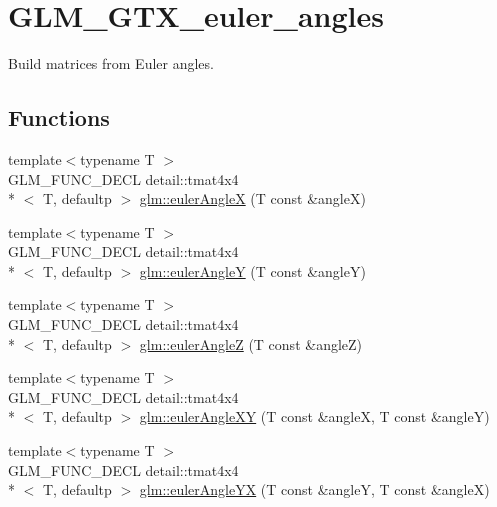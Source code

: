 \hypertarget{group__gtx__euler__angles}{\section{G\-L\-M\-\_\-\-G\-T\-X\-\_\-euler\-\_\-angles}
\label{group__gtx__euler__angles}
}


Build matrices from Euler angles.  


\subsection*{Functions}
\begin{DoxyCompactItemize}
\item 
{\footnotesize template$<$typename T $>$ }\\G\-L\-M\-\_\-\-F\-U\-N\-C\-\_\-\-D\-E\-C\-L detail\-::tmat4x4\\*
$<$ T, defaultp $>$ \hyperlink{group__gtx__euler__angles_ga97994e53d856ae89ed2622d66ab86c2c}{glm\-::euler\-Angle\-X} (T const \&angle\-X)
\item 
{\footnotesize template$<$typename T $>$ }\\G\-L\-M\-\_\-\-F\-U\-N\-C\-\_\-\-D\-E\-C\-L detail\-::tmat4x4\\*
$<$ T, defaultp $>$ \hyperlink{group__gtx__euler__angles_gacdc188a23a928d57d4490ff7d646fb96}{glm\-::euler\-Angle\-Y} (T const \&angle\-Y)
\item 
{\footnotesize template$<$typename T $>$ }\\G\-L\-M\-\_\-\-F\-U\-N\-C\-\_\-\-D\-E\-C\-L detail\-::tmat4x4\\*
$<$ T, defaultp $>$ \hyperlink{group__gtx__euler__angles_gaf55b28c29ebd7ba728f1ad6490c89687}{glm\-::euler\-Angle\-Z} (T const \&angle\-Z)
\item 
{\footnotesize template$<$typename T $>$ }\\G\-L\-M\-\_\-\-F\-U\-N\-C\-\_\-\-D\-E\-C\-L detail\-::tmat4x4\\*
$<$ T, defaultp $>$ \hyperlink{group__gtx__euler__angles_ga83a52d36fd752c92ce189197b51ea785}{glm\-::euler\-Angle\-X\-Y} (T const \&angle\-X, T const \&angle\-Y)
\item 
{\footnotesize template$<$typename T $>$ }\\G\-L\-M\-\_\-\-F\-U\-N\-C\-\_\-\-D\-E\-C\-L detail\-::tmat4x4\\*
$<$ T, defaultp $>$ \hyperlink{group__gtx__euler__angles_ga7599a8aaf3bf33b15517dd522a6d8020}{glm\-::euler\-Angle\-Y\-X} (T const \&angle\-Y, T const \&angle\-X)

\end{DoxyCompactItemize}
